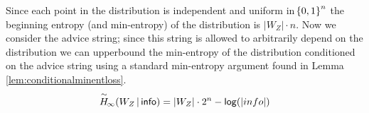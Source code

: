 Since each point in the distribution is independent and uniform in $\!\left\{ 0,1 \right\}^{n}$ the beginning  entropy (and min-entropy) of the distribution is $|W_Z| \cdot n$. 
Now we consider the advice string; since this string is allowed to arbitrarily depend on the distribution we can upperbound the min-entropy of the distribution conditioned on the advice string using a standard min-entropy argument found in Lemma \ref{lem:conditionalminentloss}. 
\[
    \overset{\sim}{H}\!_{\infty}\!\left(W_Z\,|\,\mathsf{info}\right) = |W_Z| \cdot 2^n - \mathsf{log}\!\left(|info|\right)
\]